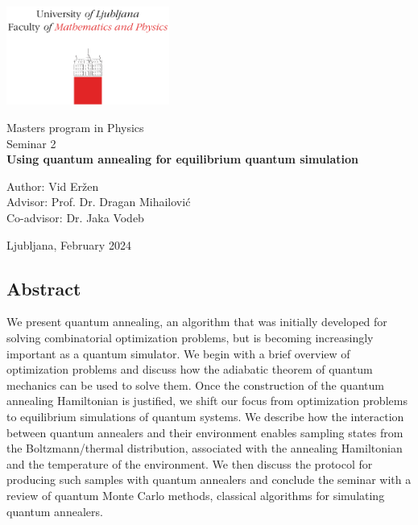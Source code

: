 \documentclass[12pt,a4paper]{article}
\begin{document}
\begin{titlepage}
    \begin{center}
        \includegraphics[width=0.4\textwidth]{../plots/logo_fmf_uni-lj_en.pdf}
            
        \vspace{1cm}    
        
        \large{Masters program in Physics}\\
        \large{Seminar 2}\\
        \vspace{2cm}
        \Large\textbf{Using quantum annealing for equilibrium quantum simulation}
            
        \vspace{1.5cm}
            
        \large{Author: Vid Eržen} \\
        \large{Advisor: Prof. Dr. Dragan Mihailović} \\
        \large{Co-advisor: Dr. Jaka Vodeb}

        \vspace{0.5cm}
            
        Ljubljana, February 2024
            
        \vspace{1.5cm}   
        
        \subsection*{Abstract}

    \end{center}
    \hspace*{0.3cm}
    We present quantum annealing, an algorithm that was initially developed
    for solving combinatorial optimization problems, but is becoming increasingly important as a
    quantum simulator. We begin with a brief overview of optimization problems and discuss how the adiabatic
    theorem of quantum mechanics can be used to solve them. Once the construction of the quantum annealing Hamiltonian
    is justified, we shift our focus from optimization problems to equilibrium simulations of quantum systems.
    We describe how the interaction between quantum annealers and their environment enables sampling states from
    the Boltzmann/thermal distribution, associated with the annealing Hamiltonian and the temperature of the
    environment. We then discuss the protocol for producing such samples with quantum annealers and conclude the
    seminar with a review of quantum Monte Carlo methods, classical algorithms for simulating quantum annealers. 
\end{titlepage}
\vspace{-1cm}
\end{document}

